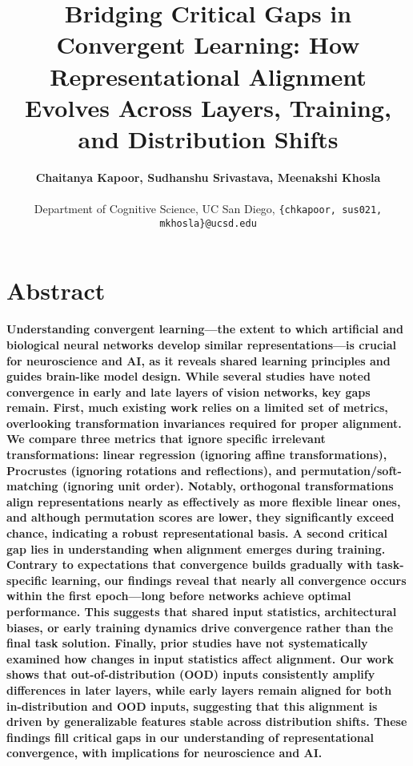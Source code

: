 \documentclass[10pt,letterpaper]{article}
\title{Bridging Critical Gaps in Convergent Learning: How Representational Alignment Evolves Across Layers, Training, and Distribution Shifts}
\author{{\large \bf Chaitanya Kapoor, Sudhanshu Srivastava, Meenakshi Khosla} \\~\\
Department of Cognitive Science, UC San Diego, \texttt{\{chkapoor, sus021, mkhosla\}@ucsd.edu}}
\begin{document}
\maketitle


\section{Abstract}
{
\bf
Understanding convergent learning---the extent to which artificial and biological neural networks develop similar representations---is crucial for neuroscience and AI, as it reveals shared learning principles and guides brain-like model design. While several studies have noted convergence in early and late layers of vision networks, key gaps remain. First, much existing work relies on a limited set of metrics, overlooking transformation invariances required for proper alignment. We compare three metrics that ignore specific irrelevant transformations: linear regression (ignoring affine transformations), Procrustes (ignoring rotations and reflections), and permutation/soft-matching (ignoring unit order). Notably, orthogonal transformations align representations nearly as effectively as more flexible linear ones, and although permutation scores are lower, they significantly exceed chance, indicating a robust representational basis. A second critical gap lies in understanding when alignment emerges during training. Contrary to expectations that convergence builds gradually with task-specific learning, our findings reveal that nearly all convergence occurs within the first epoch---long before networks achieve optimal performance. This suggests that shared input statistics, architectural biases, or early training dynamics drive convergence rather than the final task solution. Finally, prior studies have not systematically examined how changes in input statistics affect alignment. Our work shows that out-of-distribution (OOD) inputs consistently amplify differences in later layers, while early layers remain aligned for both in-distribution and OOD inputs, suggesting that this alignment is driven by generalizable features stable across distribution shifts. These findings fill critical gaps in our understanding of representational convergence, with implications for neuroscience and AI.
}
\end{document}
